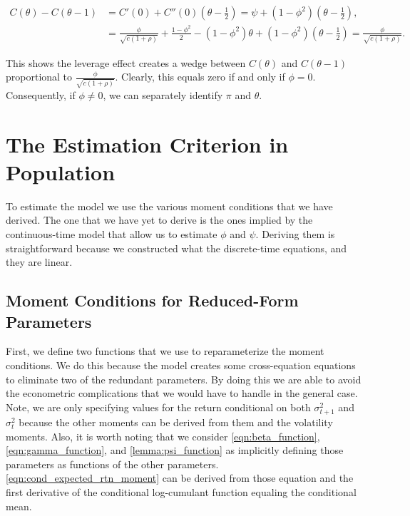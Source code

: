 \documentclass[11pt, letterpaper, twoside]{article}
\begin{document}
\begin{align}
 C(\theta) - C(\theta - 1) &= C'(0) + C''(0) \left(\theta - \frac{1}{2}\right)
%
 = \psi + (1 - \phi^2) \left(\theta - \frac{1}{2}\right), \\
%
 &= \frac{\phi}{\sqrt{c (1 + \rho )}} + \frac{1 - \phi^2}{2} - (1 - \phi^2) \theta + (1 - \phi^2)
  \left(\theta - \frac{1}{2}\right) 
%
 \label{eqn:alpha_difference}
 = \frac{\phi}{\sqrt{c (1 + \rho )}}. 
\end{align}

This shows the leverage effect creates a wedge between $C(\theta)$ and $C(\theta-1)$ proportional to $\frac{\phi}{\sqrt{c (1 + \rho )}}$. Clearly, this equals zero if and only if $\phi = 0$. Consequently, if $\phi \neq 0$, we can separately identify $\pi$ and $\theta$.

\section{The Estimation Criterion in Population}\label{sec:EstimationCriterion}

To estimate the model we use the various moment conditions that we have derived. The one that we have yet to derive is the ones implied by the continuous-time model that allow us to estimate $\phi$ and $\psi$. Deriving them is straightforward because we constructed what the discrete-time equations, and they are linear. 

\subsection{Moment Conditions for Reduced-Form Parameters}\label{sec:moment_conditions}

First, we define two functions that we use to reparameterize the moment conditions. We do this because the model creates some cross-equation equations to eliminate two of the redundant parameters. By doing this we are able to avoid the econometric complications that we would have to handle in the general case. Note, we are only specifying values for the return conditional on both $\sigma^2_{t+1}$ and $\sigma^2_t$ because the other moments can be derived from them and the volatility moments. Also, it is worth noting that we consider \cref{eqn:beta_function}, \cref{eqn:gamma_function}, and \cref{lemma:psi_function} as implicitly defining those parameters as functions of the other parameters. \cref{eqn:cond_expected_rtn_moment} can be derived from those equation and the first derivative of the conditional log-cumulant function equaling the conditional mean.
\end{document}
